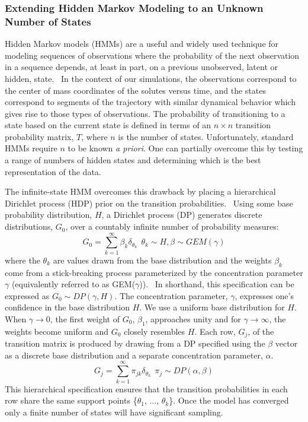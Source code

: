 \documentclass[journal=jpcbfk,manuscript=article]{achemso}
\begin{document}
  \subsubsection*{Extending Hidden Markov Modeling to an Unknown Number of States}
  
  Hidden Markov models (HMMs) are a useful and widely used technique for modeling
  sequences of observations where the probability of the next observation in a 
  sequence depends, at least in part, on a previous unobserved, latent or hidden,
  state.~\cite{beal_infinite_2002} In the context of our simulations, the observations
  correspond to the center of mass coordinates of the solutes versus time, and the
  states correspond to segments of the trajectory with similar dynamical behavior 
  which gives rise to those types of observations. The probability of transitioning 
  to a state based on the current state is defined in terms of an $n\times n$ 
  transition probability matrix, $T$, where $n$ is the number of states. Unfortunately,
  standard HMMs require $n$ to be known \textit{a priori}. One can partially overcome
  this by testing a range of numbers of hidden states and determining which is the
  best representation of the data.~\cite{pohle_selecting_2017}
  
  The infinite-state HMM overcomes this drawback by placing a hierarchical
  Dirichlet process (HDP) prior on the transition probabilities.~\cite{fox_bayesian_2010} Using some 
  base probability distribution, $H$, a Dirichlet process (DP) generates discrete 
  distributions, $G_0$, over a countably infinite number of probability measures:
  \begin{equation}
      G_0 = \sum_{k=1}^{\infty} \beta_k \delta_{\theta_k} ~~ \theta_k \sim H, \beta \sim GEM(\gamma)
  \end{equation}
  where the $\theta_k$ are values drawn from the base distribution and the weights
  $\beta_k$ come from a stick-breaking process parameterized by the concentration 
  parameter $\gamma$ (equivalently referred to as GEM($\gamma$)).~\cite{halmos_random_1944} In shorthand, this
  specification can be expressed as $G_0 \sim DP(\gamma, H)$. The concentration 
  parameter, $\gamma$, expresses one's confidence in the base distribution $H$.
  We use a uniform base distribution for $H$. When $\gamma\to 0$, the first 
  weight of $G_0$, $\beta_1$, approaches unity and for $\gamma\to\infty$, the weights
  become uniform and $G_0$ closely resembles $H$. Each row, $G_j$, of the transition 
  matrix is produced by drawing from a DP specified using the $\beta$ vector as a 
  discrete base distribution and a separate concentration parameter, $\alpha$.
  \begin{equation}
      G_j = \sum_{k=1}^{\infty} \pi_{jk} \delta_{\theta_k} ~~ \pi_j \sim DP(\alpha, \beta)
  \end{equation}
  This hierarchical specification ensures that the transition probabilities in 
  each row share the same support points \{$\theta_1$, ..., $\theta_k$\}.
  Once the model has converged only a finite number of states will have significant
  sampling.
  
\end{document}
